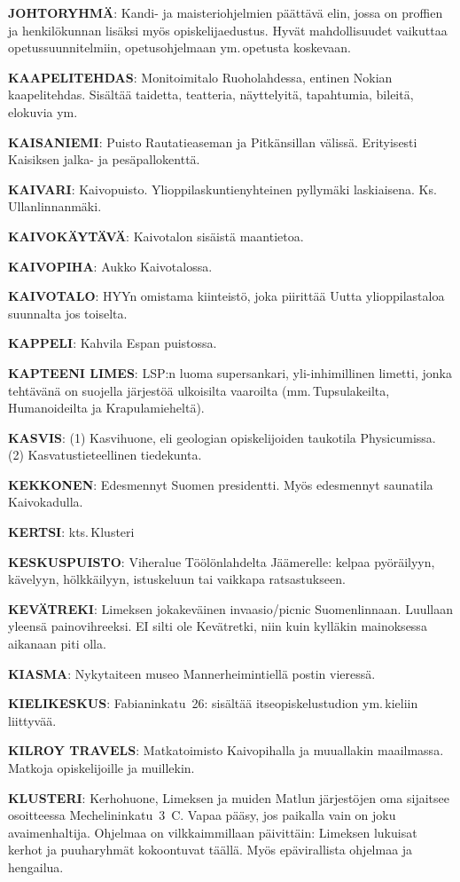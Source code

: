 \documentclass[../ala_hataile.tex]{subfiles}
\begin{document}
\textbf{JOHTORYHMÄ}: Kandi- ja maisteriohjelmien päättävä
elin, jossa on proffien ja henkilökunnan lisäksi
myös opiskelijaedustus. Hyvät mahdollisuudet
vaikuttaa opetussuunnitelmiin, opetusohjelmaan
ym.\,opetusta koskevaan.

\textbf{KAAPELITEHDAS}: Monitoimitalo
Ruoholahdessa, entinen Nokian kaapelitehdas.
Sisältää taidetta, teatteria, näyttelyitä,
tapahtumia, bileitä, elokuvia ym.

\textbf{KAISANIEMI}: Puisto Rautatieaseman ja
Pitkänsillan välissä. Erityisesti Kaisiksen
jalka- ja pesäpallokenttä.

\textbf{KAIVARI}: Kaivopuisto. Ylioppilaskuntienyhteinen
pyllymäki laskiaisena. Ks.\,Ullanlinnanmäki.

\textbf{KAIVOKÄYTÄVÄ}: Kaivotalon sisäistä
maantietoa.

\textbf{KAIVOPIHA}: Aukko Kaivotalossa.

\textbf{KAIVOTALO}: HYYn omistama kiinteistö,
joka piirittää Uutta ylioppilastaloa
suunnalta jos toiselta.

\textbf{KAPPELI}: Kahvila Espan puistossa.

\textbf{KAPTEENI LIMES}: LSP:n luoma supersankari,
yli-inhimillinen limetti, jonka
tehtävänä on suojella järjestöä ulkoisilta
vaaroilta (mm.\,Tupsulakeilta, Humanoideilta
ja Krapulamieheltä).

\textbf{KASVIS}: (1) Kasvihuone, eli geologian opiskelijoiden
taukotila Physicumissa. (2) Kasvatustieteellinen tiedekunta.

\textbf{KEKKONEN}: Edesmennyt Suomen presidentti.
Myös edesmennyt saunatila Kaivokadulla.

\textbf{KERTSI}: kts.\,Klusteri

\textbf{KESKUSPUISTO}: Viheralue Töölönlahdelta
Jäämerelle: kelpaa pyöräilyyn, kävelyyn,
hölkkäilyyn, istuskeluun tai vaikkapa
ratsastukseen.

\textbf{KEVÄTREKI}: Limeksen jokakeväinen
invaasio/picnic Suomenlinnaan. Luullaan
yleensä painovihreeksi. EI silti ole Kevätretki,
niin kuin kylläkin mainoksessa aikanaan
piti olla.

\textbf{KIASMA}: Nykytaiteen museo Mannerheimintiellä
postin vieressä.

\textbf{KIELIKESKUS}: Fabianinkatu~26: sisältää
itse\-opiskelu\-studion ym.\,kieliin liittyvää.

\textbf{KILROY TRAVELS}: Matkatoimisto
Kaivopihalla ja muuallakin maailmassa.
Matkoja opiskelijoille ja muillekin.

\textbf{KLUSTERI}: Kerhohuone, Limeksen ja
muiden Matlun järjestöjen oma sijaitsee
osoitteessa Mechelininkatu~3~C. Vapaa pääsy,
jos paikalla vain on joku avaimenhaltija.
Ohjelmaa on vilkkaimmillaan päivittäin:
Limeksen lukuisat kerhot ja puuharyhmät
kokoontuvat täällä. Myös epävirallista ohjelmaa
ja hengailua.
\end{document}
